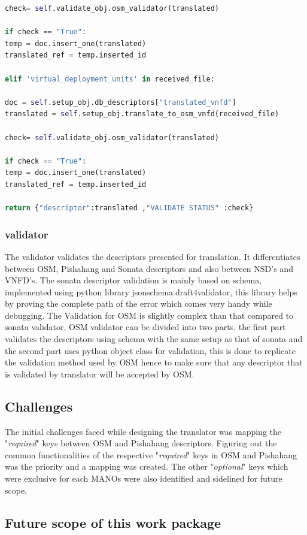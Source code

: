 \begin{lstlisting}[language=Python,caption= Translating descriptor between Pishahang and OSM, label=lis:toSOnata]
check= self.validate_obj.osm_validator(translated)

if check == "True":
temp = doc.insert_one(translated)
translated_ref = temp.inserted_id

elif 'virtual_deployment_units' in received_file:

doc = self.setup_obj.db_descriptors["translated_vnfd"]
translated = self.setup_obj.translate_to_osm_vnfd(received_file)

check= self.validate_obj.osm_validator(translated)

if check == "True":
temp = doc.insert_one(translated)
translated_ref = temp.inserted_id

return {"descriptor":translated ,"VALIDATE STATUS" :check}
\end{lstlisting}

\subsubsection{validator}

The validator validates the descriptors presented for translation. It differentiates between OSM, Pishahang and Sonata descriptors and also between NSD's and VNFD's. The sonata descriptor validation is mainly based on schema, implemented using python library jsonschema.draft4validator, this library helps by proving the complete path of the error which comes very handy while debugging. The Validation for OSM is slightly complex than that compared to sonata validator, OSM validator can be divided into two parts. the first part validates the descriptors using schema with the same setup as that of sonata and the second part uses python object class for validation, this is done to replicate the validation method used by OSM hence to make sure that any descriptor that is validated by translator will be accepted by OSM.

\subsection{Challenges}
The initial challenges faced while designing the translator was mapping the "\textit{required}" keys between OSM and Pishahang descriptors. Figuring out the common functionalities of the respective "\textit{required}" keys in OSM and Pishahang was the priority and a mapping was created. The other "\textit{optional}" keys which were exclusive for each MANOs were also identified and sidelined for future scope.

\subsection{Future scope of this work package}

